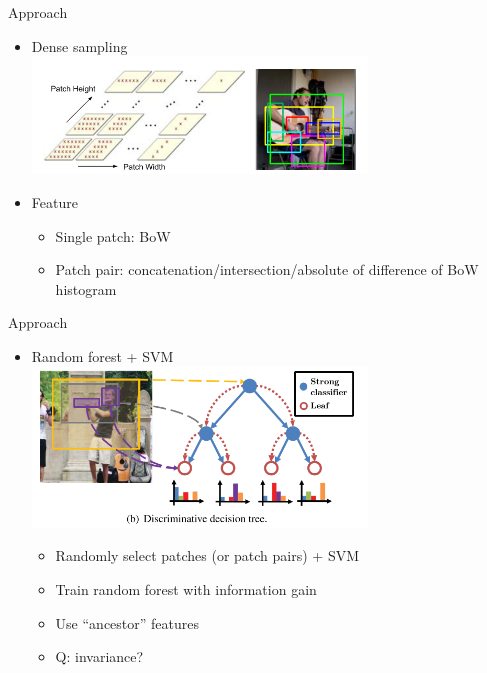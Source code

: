 \documentclass[12pt]{beamer}
\begin{document}
\begin{frame}{Approach}
    \begin{itemize}
        \item Dense sampling \\
        \medskip
        { \includegraphics[width=0.7\textwidth]{fffig2.png} } \\
        \item Feature
        \begin{itemize}
            \item Single patch: BoW
            \item Patch pair: concatenation/intersection/absolute of difference of BoW histogram
        \end{itemize} 
    \end{itemize}
\end{frame}

\begin{frame}{Approach}
    \begin{itemize}
        \item Random forest + SVM \\
        \medskip
        { \includegraphics[width=0.7\textwidth]{fffig3.png} }
        \begin{itemize}
            \item Randomly select patches (or patch pairs) + SVM
            \item Train random forest with information gain
            \item Use ``ancestor'' features
            \item Q: invariance?
        \end{itemize}
    \end{itemize}
\end{frame}
\end{document}
